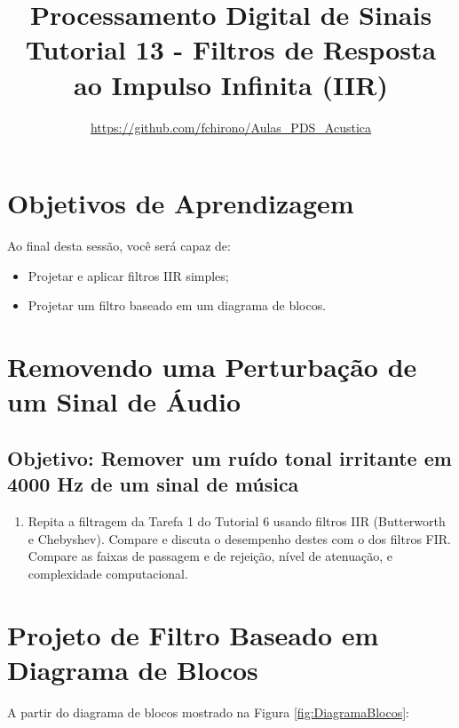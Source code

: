 \documentclass[a4paper,twoside,12pt]{article}
\title{\vspace{-2cm} Processamento Digital de Sinais\\ Tutorial 13 - Filtros de Resposta ao Impulso Infinita (IIR)}
\author{\url{https://github.com/fchirono/Aulas_PDS_Acustica}}
\begin{document}
	\date{}
	\maketitle
	
	
	\section*{Objetivos de Aprendizagem}
	Ao final desta sessão, você será capaz de:
	\begin{itemize}
		\item Projetar e aplicar filtros IIR simples;
		\item Projetar um filtro baseado em um diagrama de blocos.
	\end{itemize}
	
	\begingroup
	\let\clearpage\relax
	\tableofcontents
	\endgroup
	
	\section{Removendo uma Perturbação de um Sinal de Áudio}
	
	\subsection*{Objetivo: Remover um ruído tonal irritante em 4000 Hz de um sinal de música}
	
	\begin{enumerate}
		\item Repita a filtragem da Tarefa 1 do Tutorial 6 usando filtros IIR (Butterworth e Chebyshev). Compare e discuta o desempenho destes com o dos filtros FIR. Compare as faixas de passagem e de rejeição, nível de atenuação, e complexidade computacional.
		
	\end{enumerate}
	
	\section{Projeto de Filtro Baseado em Diagrama de Blocos}
	
	A partir do diagrama de blocos mostrado na Figura \ref{fig:DiagramaBlocos}:
	
\end{document}
